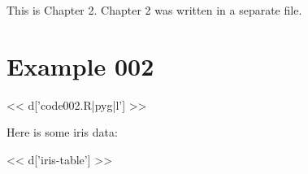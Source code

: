 This is Chapter 2. Chapter 2 was written in a separate file.

\section{Example 002}

<< d['code002.R|pyg|l'] >>

Here is some iris data:

<< d['iris-table'] >>


